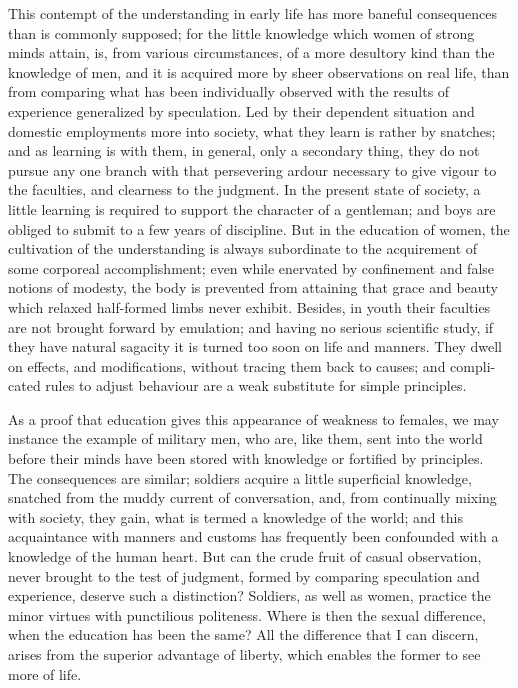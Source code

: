This contempt of the understanding in early life has more baneful
consequences than is commonly supposed; for the little knowledge which
women of strong minds attain, is, from various circumstances, of a
more desultory kind than the knowledge of men, and it is acquired more
by sheer observations on real  life, than from comparing what
has been individually observed with the results of experience
generalized by speculation. Led by their dependent situation and
domestic employments more into society, what they learn is rather by
snatches; and as learning is with them, in general, only a secondary
thing, they do not pursue any one branch with that persevering ardour
necessary to give vigour to the faculties, and clearness to the
judgment. In the present state of society, a little learning is
required to support the character of a gentleman; and boys are obliged
to submit to a few years of discipline. But in the education of women,
the cultivation of the understanding is always subordinate to the
acquirement of some corporeal accomplishment; even while enervated by
confinement and false notions of modesty, the body is prevented from
attaining that grace and beauty which relaxed half-formed limbs never
exhibit. Besides, in youth their faculties are not brought forward by
emulation; and having no serious scientific study, if they have
natural sagacity it is turned too soon on life and manners. They dwell
on effects, and modifications, without tracing them back to causes;
and compli-cated rules to adjust behaviour are a weak
substitute for simple principles.

As a proof that education gives this appearance of weakness to
females, we may instance the example of military men, who are, like
them, sent into the world before their minds have been stored with
knowledge or fortified by principles. The consequences are similar;
soldiers acquire a little superficial knowledge, snatched from the
muddy current of conversation, and, from continually mixing with
society, they gain, what is termed a knowledge of the world; and this
acquaintance with manners and customs has frequently been confounded
with a knowledge of the human heart. But can the crude fruit of casual
observation, never brought to the test of judgment, formed by
comparing speculation and experience, deserve such a distinction?
Soldiers, as well as women, practice the minor virtues with
punctilious politeness. Where is then the sexual difference, when the
education has been the same? All the difference that I can discern,
arises from the superior advantage of liberty, which enables the
former to see more of life.

